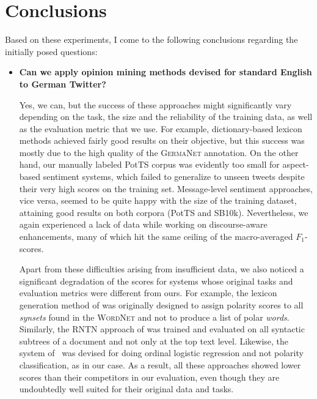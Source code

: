 \documentclass[11pt]{article}
\newcommand{\F}[0]{$F_1$}
\begin{document}
\section{Conclusions}

Based on these experiments, I come to the following conclusions
regarding the initially posed questions:

\begin{itemize}
  \item\textbf{Can we apply opinion mining methods devised for
    standard English to German Twitter?}

    Yes, we can, but the success of these approaches might
    significantly vary depending on the task, the size and the
    reliability of the training data, as well as the evaluation metric
    that we use. For example, dictionary-based lexicon methods
    achieved fairly good results on their objective, but this success
    was mostly due to the high quality of the \textsc{GermaNet}
    annotation.  On the other hand, our manually labeled PotTS corpus
    was evidently too small for aspect-based sentiment systems, which
    failed to generalize to unseen tweets despite their very high
    scores on the training set.  Message-level sentiment approaches,
    vice versa, seemed to be quite happy with the size of the training
    dataset, attaining good results on both corpora (PotTS and SB10k).
    Nevertheless, we again experienced a lack of data while working on
    discourse-aware enhancements, many of which hit the same ceiling
    of the macro-averaged \F{}-scores.

    Apart from these difficulties arising from insufficient data, we
    also noticed a significant degradation of the scores for systems
    whose original tasks and evaluation metrics were different from
    ours.  For example, the lexicon generation method of
    \citet{Esuli:05} was originally designed to assign polarity scores
    to all \emph{synsets} found in the \textsc{WordNet} and not to
    produce a list of polar \emph{words}.  Similarly, the RNTN
    approach of \citet{Socher:13} was trained and evaluated on all
    syntactic subtrees of a document and not only at the top text
    level.  Likewise, the system of~\citet{Yessenalina:11} was devised
    for doing ordinal logistic regression and not polarity
    classification, as in our case.  As a result, all these approaches
    showed lower scores than their competitors in our evaluation, even
    though they are undoubtedly well suited for their original data
    and tasks.


\end{itemize}
\end{document}
